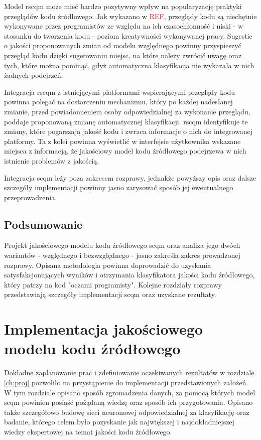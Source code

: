 \documentclass[12pt]{report}
\begin{document}
Model \gls{rscqm} może mieć bardzo pozytywny wpływ na popularyzację praktyki przeglądów kodu źródłowego. Jak wykazano w \textcolor{red}{REF}, przeglądy kodu są niechętnie wykonywane przez programistów ze względu na ich czasochłonność i niski - w stosunku do tworzenia kodu - poziom kreatywności wykonywanej pracy. Sugestie o jakości proponowanych zmian od modelu względnego powinny przyspieszyć przegląd kodu dzięki sugerowaniu miejsc, na które należy zwrócić uwagę oraz tych, które można pominąć, gdyż automatyczna klasyfikacja nie wykazała w nich żadnych podejrzeń.

Integracja \gls{rscqm} z istniejącymi platformami wspierającymi przeglądy kodu powinna polegać na dostarczeniu mechanizmu, który po każdej nadesłanej zmianie, przed powiadomieniem osoby odpowiedzialnej za wykonanie przeglądu, poddaje proponowaną zmianę automatycznej klasyfikacji. \gls{rscqm} identyfikuje te zmiany, które pogarszają jakość kodu i zwraca informacje o nich do integrowanej platformy. Ta z kolei powinna wyświetlić w interfejsie użytkownika wskazane miejsca z informacją, że jakościowy model kodu źródłowego podejrzewa w nich istnienie problemów z jakością.

Integracja \gls{scqm} leży poza zakresem rozprawy, jednakże powyższy opis oraz dalsze szczegóły implementacji powinny jasno zarysować sposób jej ewentualnego przeprowadzenia.


\section{Podsumowanie}
Projekt jakościowego modelu kodu źródłowego \gls{scqm} oraz analiza jego dwóch wariantów - względnego i bezwzględnego - jasno zakreśla zakres prowadzonej rozprawy. Opisana metodologia powinna doprowadzić do uzyskania satysfakcjonujących wyników i otrzymania klasyfikatora jakości kodu źródłowego, który patrzy na kod "oczami programisty". Kolejne rozdziały rozprawy przedstawiają szczegóły implementacji \gls{scqm} oraz uzyskane rezultaty.

\chapter{Implementacja jakościowego modelu kodu źródłowego}
\label{ch:impl}

Dokładne zaplanowanie prac i zdefiniowanie oczekiwanych rezultatów w rozdziale \ref{ch:proj} pozwoliło na przystąpienie do implementacji przedstawionych założeń. W tym rozdziale opisano sposób zgromadzenia danych, za pomocą których model \gls{scqm} powinien posiąść pożądaną wiedzę oraz sposób ich przygotowania. Opisano także szczegółowo budowę sieci neuronowej odpowiedzialnej za klasyfikację oraz badanie, którego celem było pozyskanie jak największej i najdokładniejszej wiedzy ekspertowej na temat jakości kodu źródłowego.
\end{document}
